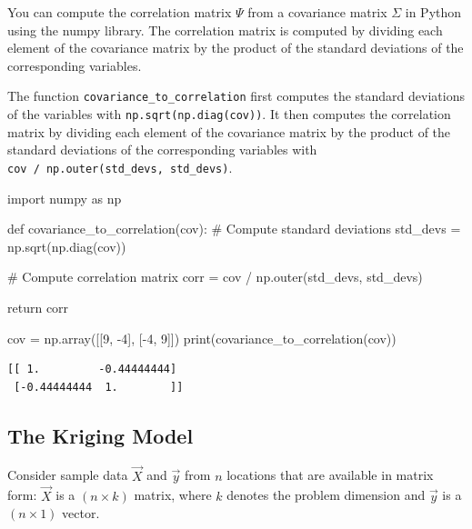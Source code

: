 \documentclass[
  letterpaper,
  DIV=11,
  numbers=noendperiod]{scrreprt}
\newenvironment{Shaded}{\begin{snugshade}}{\end{snugshade}}
\newcommand{\BuiltInTok}[1]{\textcolor[rgb]{0.00,0.23,0.31}{#1}}
\newcommand{\CommentTok}[1]{\textcolor[rgb]{0.37,0.37,0.37}{#1}}
\newcommand{\ControlFlowTok}[1]{\textcolor[rgb]{0.00,0.23,0.31}{#1}}
\newcommand{\DecValTok}[1]{\textcolor[rgb]{0.68,0.00,0.00}{#1}}
\newcommand{\ImportTok}[1]{\textcolor[rgb]{0.00,0.46,0.62}{#1}}
\newcommand{\KeywordTok}[1]{\textcolor[rgb]{0.00,0.23,0.31}{#1}}
\newcommand{\NormalTok}[1]{\textcolor[rgb]{0.00,0.23,0.31}{#1}}
\newcommand{\OperatorTok}[1]{\textcolor[rgb]{0.37,0.37,0.37}{#1}}
\begin{document}
You can compute the correlation matrix \(\Psi\) from a covariance matrix
\(\Sigma\) in Python using the numpy library. The correlation matrix is
computed by dividing each element of the covariance matrix by the
product of the standard deviations of the corresponding variables.

The function \texttt{covariance\_to\_correlation} first computes the
standard deviations of the variables with
\texttt{np.sqrt(np.diag(cov))}. It then computes the correlation matrix
by dividing each element of the covariance matrix by the product of the
standard deviations of the corresponding variables with
\texttt{cov\ /\ np.outer(std\_devs,\ std\_devs)}.

\begin{Shaded}
\begin{Highlighting}[]
\ImportTok{import}\NormalTok{ numpy }\ImportTok{as}\NormalTok{ np}

\KeywordTok{def}\NormalTok{ covariance\_to\_correlation(cov):}
    \CommentTok{\# Compute standard deviations}
\NormalTok{    std\_devs }\OperatorTok{=}\NormalTok{ np.sqrt(np.diag(cov))}
    
    \CommentTok{\# Compute correlation matrix}
\NormalTok{    corr }\OperatorTok{=}\NormalTok{ cov }\OperatorTok{/}\NormalTok{ np.outer(std\_devs, std\_devs)}
    
    \ControlFlowTok{return}\NormalTok{ corr}

\NormalTok{cov }\OperatorTok{=}\NormalTok{ np.array([[}\DecValTok{9}\NormalTok{, }\OperatorTok{{-}}\DecValTok{4}\NormalTok{], [}\OperatorTok{{-}}\DecValTok{4}\NormalTok{, }\DecValTok{9}\NormalTok{]])}
\BuiltInTok{print}\NormalTok{(covariance\_to\_correlation(cov))}
\end{Highlighting}
\end{Shaded}

\begin{verbatim}
[[ 1.         -0.44444444]
 [-0.44444444  1.        ]]
\end{verbatim}

\subsection{The Kriging Model}\label{the-kriging-model}

Consider sample data \(\vec{X}\) and \(\vec{y}\) from \(n\) locations
that are available in matrix form: \(\vec{X}\) is a \((n \times k)\)
matrix, where \(k\) denotes the problem dimension and \(\vec{y}\) is a
\((n\times 1)\) vector.
\end{document}
